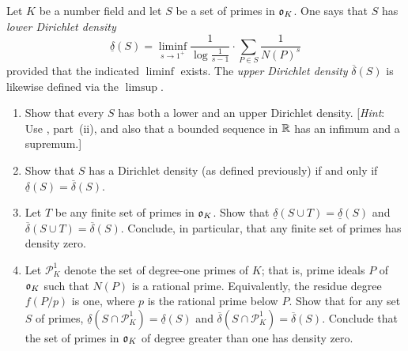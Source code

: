 
\begin{exercise}[16]
  \label{ex:ch7-16}
  Let $K$ be a number field and let $S$ be a set of primes in $\mathfrak{o}_K$. One
  says that $S$ has \emph{lower Dirichlet density}
  \[
    \underline{\delta}(S) = \liminf_{s \to 1^+} \frac{1}{\log\frac{1}{s-1}}
    \cdot \sum_{P \in S} \frac{1}{N(P)^s}
  \]
  provided that the indicated $\liminf$ exists. The \emph{upper Dirichlet
  density} $\overline{\delta}(S)$ is likewise defined via the $\limsup$.
  \begin{enumerate}[label=(\alph*)]
    \item Show that every $S$ has both a lower and an upper Dirichlet
      density. [\emph{Hint}: Use , part~(ii), and also
      that a bounded sequence in $\mathbb{R}$ has an infimum and a supremum.]
    \item Show that $S$ has a Dirichlet density (as defined previously) if
      and only if $\underline{\delta}(S) = \overline{\delta}(S)$.
    \item Let $T$ be any finite set of primes in $\mathfrak{o}_K$. Show that
      $\underline{\delta}(S \cup T) = \underline{\delta}(S)$ and
      $\overline{\delta}(S \cup T) = \overline{\delta}(S)$. Conclude, in
      particular, that any finite set of primes has density zero.
    \item Let $\mathscr{P}_K^1$ denote the set of degree-one primes of $K$;
      that is, prime ideals $P$ of $\mathfrak{o}_K$ such that $N(P)$ is a rational
      prime. Equivalently, the residue degree $f(P/p)$ is one, where $p$
      is the rational prime below $P$. Show that for any set $S$ of primes,
      $\underline{\delta}(S \cap \mathscr{P}_K^1) = \underline{\delta}(S)$
      and $\overline{\delta}(S \cap \mathscr{P}_K^1) = \overline{\delta}(S)$.
      Conclude that the set of primes in $\mathfrak{o}_K$ of degree greater than
      one has density zero.
  \end{enumerate}
\end{exercise}

